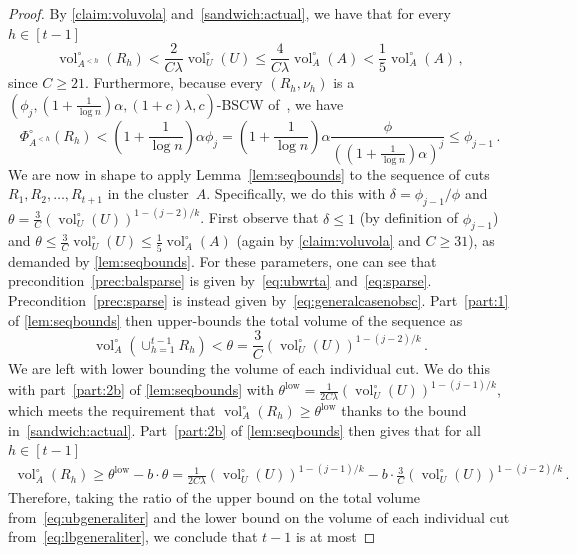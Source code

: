\documentclass[epsfig,letter,11pt]{article}
\numberwithin{equation}{section}
\newcommand{\unvolc}[2]{\operatorname{vol}_{#2}^\circ (#1)}
\newcommand{\unspc}[2]{\Phi_{#2}^\circ (#1)}
\DeclareMathOperator*{\low}{low}
\begin{document}
\begin{proof}
	\noindent
	By \cref{claim:voluvola} and~\eqref{sandwich:actual}, we have that for every $h \in [t-1]$
	\begin{equation}
		\label{eq:ubwrta}
		\unvolc{R_h}{A^{<h}} < \frac{2}{C\lambda}\unvolc{U}{U} \le \frac{4}{C\lambda}\unvolc{A}{A} < \frac{1}{5}\unvolc{A}{A} \, ,
	\end{equation}
	since $C \ge 21$. Furthermore, because every $(R_h,\nu_h)$ is a $(\phi_j,(1+\frac{1}{\log n})\alpha,(1+c)\lambda,c)$-BSCW of~, we have
	\begin{equation}
		\label{eq:sparse}
		\unspc{R_h}{A^{<h}} < \left(1+\frac{1}{ \log n}\right) \alpha \phi_{j} = \left(1+\frac{1}{ \log n}\right) \alpha \frac{\phi}{\left( \left(1+\frac{1}{ \log n}\right) \alpha\right)^{j}}  \le \phi_{j-1} \, .
	\end{equation}
	We are now in shape to apply Lemma~\ref{lem:seqbounds} to the sequence of cuts $R_1,R_2, \dots, R_{t+1}$ in the cluster~$A$. Specifically, we do this with $\delta=\phi_{j-1}/\phi$ and $\theta = \frac{3}{C}(\unvolc{U}{U})^{1-(j-2)/k}$. First observe that $\delta \le 1$ (by definition of $\phi_{j-1}$) and $ \theta \le  \frac{3}{C}\unvolc{U}{U} \le \frac{1}{5}\unvolc{A}{A}$ (again by \cref{claim:voluvola} and $C \ge 31$), as demanded by \cref{lem:seqbounds}. For these parameters, one can see that precondition~\eqref{prec:balsparse} is given by~\eqref{eq:ubwrta} and~\eqref{eq:sparse}. Precondition~\eqref{prec:sparse} is instead given by~\eqref{eq:generalcasenobsc}. Part~\eqref{part:1} of \cref{lem:seqbounds} then upper-bounds the total volume of the sequence as
	\begin{equation}
		\label{eq:ubgeneraliter}
		\unvolc{\cup_{h=1}^{t-1} R_h}{A} < \theta =  \frac{3}{C}\left(\unvolc{U}{U}\right)^{1-(j-2)/k} \, .
	\end{equation}
	We are left with lower bounding the volume of each individual cut. We do this with part~\eqref{part:2b} of \cref{lem:seqbounds} with $\theta^{\low} = \frac{1}{2C\lambda}(\unvolc{U}{U})^{1-(j-1)/k}$, which meets the requirement that $	\unvolc{R_h}{A} \ge \theta^{\low}$ thanks to the bound in~\eqref{sandwich:actual}. Part~\eqref{part:2b} of \cref{lem:seqbounds} then gives that for all $h \in [t-1]$
	\begin{align}
			\label{eq:lbgeneraliter}
		\unvolc{R_h}{A} \ge \theta^{\low} - b \cdot \theta = \frac{1}{2C\lambda}\left(\unvolc{U}{U}\right)^{1-(j-1)/k} - b \cdot  \frac{3}{C}\left(\unvolc{U}{U}\right)^{1-(j-2)/k}\, .
	\end{align}
	Therefore, taking the ratio of the upper bound on the total volume from~\eqref{eq:ubgeneraliter} and the lower bound on the volume of each individual cut from~\eqref{eq:lbgeneraliter}, we conclude that $t-1$ is at most

\end{proof}
\end{document}
